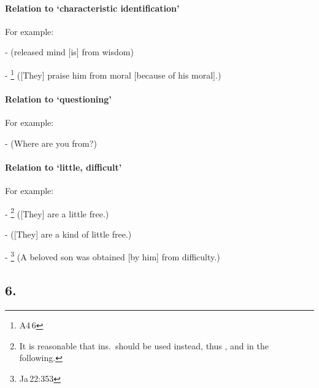 \paragraph*{Relation to `characteristic identification'} For example:\par
-  (released mind [is] from wisdom)\par
- \footnote{A4\,6} ([They] praise him from moral [because of his moral].)\par

\paragraph*{Relation to `questioning'} For example:\par
-  (Where are you from?)\par

\paragraph*{Relation to `little, difficult'} For example:\par
- \footnote{It is reasonable that ins.\ should be used instead, thus , and  in the following.} ([They] are a little free.)\par
-  ([They] are a kind of little free.)\par
- \footnote{Ja\,22:353} (A beloved son was obtained [by him] from difficulty.)\par

{}
\subsection*{6.\,}

